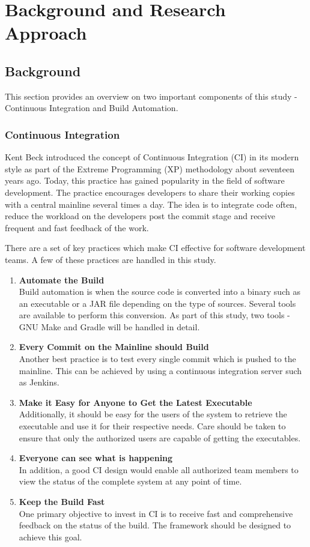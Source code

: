 \documentclass[12pt, a4paper, titlepage]{scrartcl}
\begin{document}
\section{Background and Research Approach}

\subsection{Background}
This section provides an overview on two important components of this study - Continuous Integration and Build Automation. 
\subsubsection{Continuous Integration}
\par Kent Beck introduced the concept of Continuous Integration (CI) in its modern style as part of the Extreme Programming (XP) methodology about seventeen years ago\cite{beck2000extreme}. Today, this practice has gained popularity in the field of software development. The practice encourages developers to share their working copies with a central mainline several times a day. The idea is to integrate code often, reduce the workload on the developers post the commit stage and receive frequent and fast feedback of the work. 
\par There are a set of key practices which make CI effective for software development teams\cite{fowler2006continuous}. A few of these practices are handled in this study. 
\begin{enumerate}
\item \textbf{Automate the Build} \\
Build automation is when the source code is converted into a binary such as an executable or a JAR file depending on the type of sources. Several tools are available to perform this conversion. As part of this study, two tools - GNU Make and Gradle will be handled in detail. 
\item \textbf{Every Commit on the Mainline should Build} \\
Another best practice is to test every single commit which is pushed to the mainline. This can be achieved by using a continuous integration server  such as Jenkins. 
\item \textbf{Make it Easy for Anyone to Get the Latest Executable} \\
Additionally, it should be easy for the users of the system to retrieve the executable and use it for their respective needs. Care should be taken to ensure that only the authorized users are capable of getting the executables.
\item \textbf{Everyone can see what is happening} \\
In addition, a good CI design would enable all authorized team members to view the status of the complete system at any point of time.  
\item \textbf{Keep the Build Fast} \\
One primary objective to invest in CI is to receive fast and comprehensive feedback on the status of the build. The framework should be designed to achieve this goal. 
\end{enumerate}
\end{document}
